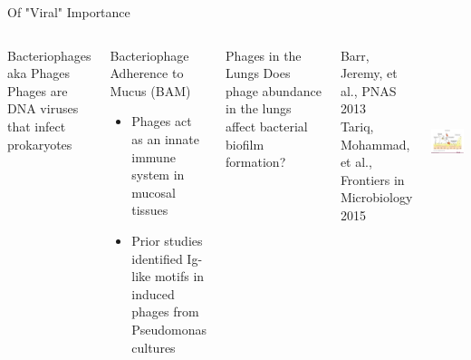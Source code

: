 \documentclass[11pt]{beamer}
\begin{document}
	
	\begin{frame}{Of "Viral" Importance}
	\begin{columns}
	
	\begin{block}{Bacteriophages aka Phages}
	Phages are DNA viruses that infect prokaryotes
	\end{block}
	
	\begin{block}{Bacteriophage Adherence to Mucus (BAM)}
	\begin{itemize}
	\item \alert{Phages act as an innate immune system in mucosal tissues}
	\item Prior studies identified Ig-like motifs in induced phages from Pseudomonas cultures
	\end{itemize}
	\end{block}
	\vspace{-0.3cm}
	\begin{block}{Phages in the Lungs}
	Does phage abundance in the lungs affect bacterial biofilm formation?
	\end{block}
	\vspace{0.2cm}
	\tiny{ Barr, Jeremy, et al., PNAS 2013 \\ Tariq, Mohammad, et al., Frontiers in Microbiology 2015}
	
	\includegraphics[height=5.5cm, width=5cm]{barr.png}
	\end{columns}

	
	
	
	\end{frame}
	
\end{document}
